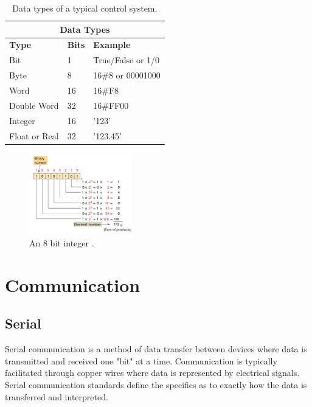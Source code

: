     \begin{table}
    \centering
    \caption{Data types of a typical control system.}
        \begin{tabular}{ |p{3cm}|p{2cm}|p{3cm}|  }
                \hline
                \multicolumn{3}{|c|}{\textbf{Data Types}} \\
                \hline
                \textbf{Type}& \textbf{Bits}& \textbf{Example} \\
                \hline
                Bit & 1 & True/False or 1/0 \\
                Byte & 8 & 16\#8 or 00001000 \\
                Word & 16 & 16\#F8 \\
                Double Word & 32 & 16\#FF00 \\
                Integer & 16 & '123' \\
                Float or Real & 32 & '123.45'\\
                \hline
        \end{tabular}
        \label{table:dataTypes}   
        
    \end{table}
    

        \begin{figure}[H]
            \centering
            \includegraphics[width = 0.4\textwidth]{2_images/int.png}
            \caption{An 8 bit integer \cite{petruzella2017programmable}.}
            \label{fig:int}
        \end{figure}         

\section{Communication}

\subsection{Serial}
    Serial communication is a method of data transfer between devices where data is transmitted and received one "bit" at a time. Communication is typically facilitated through copper wires where data is represented by electrical signals. Serial communication standards define the specifics as to exactly how the data is transferred and interpreted. %
    
